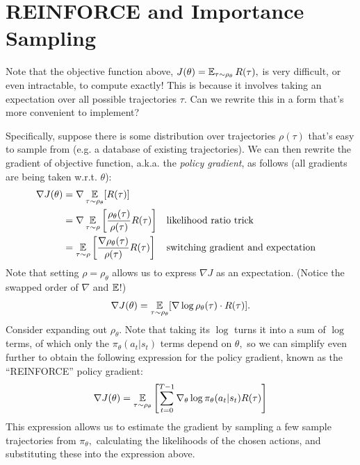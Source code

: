 \documentclass[\main/main]{subfiles}
\begin{document}
\section{REINFORCE and Importance Sampling}

Note that the objective function above, $J(\theta) = \operatorname*{\mathbb{E}}_{\tau \sim \rho_\theta}R(\tau),$ is very difficult, or even intractable, to compute exactly! This is because it involves taking an expectation over all possible trajectories $\tau.$
Can we rewrite this in a form that's more convenient to implement?

Specifically, suppose there is some distribution over trajectories $\rho(\tau)$ that's easy to sample from (e.g. a database of existing trajectories).
We can then rewrite the gradient of objective function, a.k.a. the \emph{policy gradient}, as follows (all gradients are being taken w.r.t. $\theta$):
\begin{align*}
    \nabla J(\theta) & = \nabla \operatorname*{\mathbb{E}}_{\tau \sim \rho_\theta} [ R(\tau) ]                                                                                         \\
                     & = \nabla \operatorname*{\mathbb{E}}_{\tau \sim \rho} \left[ \frac{\rho_\theta(\tau)}{\rho(\tau)} R(\tau) \right] &  & \text{likelihood ratio trick}             \\
                     & = \operatorname*{\mathbb{E}}_{\tau \sim \rho} \left[ \frac{\nabla \rho_\theta(\tau)}{\rho(\tau)} R(\tau) \right] &  & \text{switching gradient and expectation}
\end{align*}
Note that setting $\rho = \rho_\theta$ allows us to express $\nabla J$ as an expectation. (Notice the swapped order of $\nabla$ and $\operatorname*{\mathbb{E}}$!)
\begin{align*}
    \nabla J(\theta) = \operatorname*{\mathbb{E}}_{\tau \sim \rho_\theta} [ \nabla \log \rho_\theta(\tau) \cdot R(\tau)].
\end{align*}
Consider expanding out $\rho_\theta.$ Note that taking its $\log$ turns it into a sum of $\log$ terms, of which only the $\pi_\theta(a_t | s_t)$ terms depend on $\theta,$ so we can simplify even further to obtain the following expression for the policy gradient, known as the ``REINFORCE'' policy gradient:
\begin{align*}
    \nabla J(\theta) = \operatorname*{\mathbb{E}}_{\tau \sim \rho_\theta} \left[ \sum_{t=0}^{T-1} \nabla_\theta \log \pi_{\theta}(a_t | s_t) R(\tau) \right]
\end{align*}
This expression allows us to estimate the gradient by sampling a few sample trajectories from $\pi_\theta,$ calculating the likelihoods of the chosen actions, and substituting these into the expression above.
\end{document}
